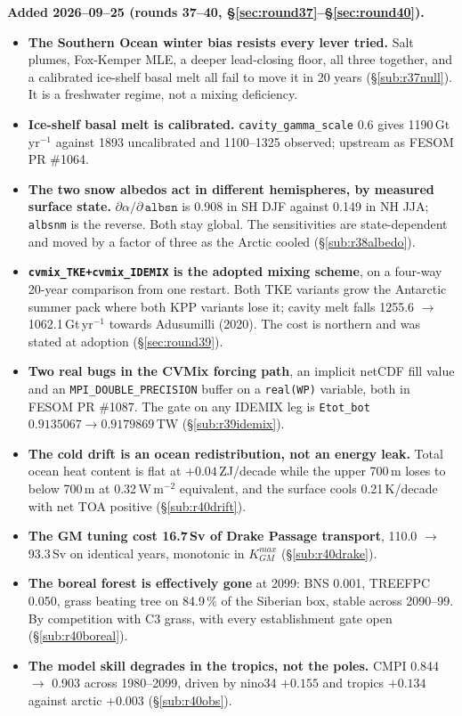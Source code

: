 \documentclass[10pt]{article}
\begin{document}
\textbf{Added 2026--09--25 (rounds 37--40, \S\ref{sec:round37}--\S\ref{sec:round40}).}
\begin{itemize}\itemsep2pt
\item \textbf{The Southern Ocean winter bias resists every lever tried.} Salt plumes, Fox-Kemper
MLE, a deeper lead-closing floor, all three together, and a calibrated ice-shelf basal melt all
fail to move it in 20 years (\S\ref{sub:r37null}). It is a freshwater regime, not a mixing
deficiency.
\item \textbf{Ice-shelf basal melt is calibrated.} \texttt{cavity\_gamma\_scale} 0.6 gives
1190\,Gt\,yr$^{-1}$ against 1893 uncalibrated and 1100--1325 observed; upstream as FESOM
PR \#1064.
\item \textbf{The two snow albedos act in different hemispheres, by measured surface state.}
$\partial\alpha/\partial\,\texttt{albsn}$ is 0.908 in SH DJF against 0.149 in NH JJA;
\texttt{albsnm} is the reverse. Both stay global. The sensitivities are state-dependent and
moved by a factor of three as the Arctic cooled (\S\ref{sub:r38albedo}).
\item \textbf{\texttt{cvmix\_TKE+cvmix\_IDEMIX} is the adopted mixing scheme}, on a four-way
20-year comparison from one restart. Both TKE variants grow the Antarctic summer pack where
both KPP variants lose it; cavity melt falls 1255.6 $\to$ 1062.1\,Gt\,yr$^{-1}$ towards
Adusumilli (2020). The cost is northern and was stated at adoption (\S\ref{sec:round39}).
\item \textbf{Two real bugs in the CVMix forcing path}, an implicit netCDF fill value and an
\texttt{MPI\_DOUBLE\_PRECISION} buffer on a \texttt{real(WP)} variable, both in FESOM PR
\#1087. The gate on any IDEMIX leg is \texttt{Etot\_bot} $0.9135067\to0.9179869$\,TW
(\S\ref{sub:r39idemix}).
\item \textbf{The cold drift is an ocean redistribution, not an energy leak.} Total ocean heat
content is flat at $+0.04$\,ZJ/decade while the upper 700\,m loses to below 700\,m at
0.32\,W\,m$^{-2}$ equivalent, and the surface cools 0.21\,K/decade with net TOA positive
(\S\ref{sub:r40drift}).
\item \textbf{The GM tuning cost 16.7\,Sv of Drake Passage transport}, 110.0 $\to$ 93.3\,Sv on
identical years, monotonic in $K_{GM}^{max}$ (\S\ref{sub:r40drake}).
\item \textbf{The boreal forest is effectively gone} at 2099: BNS 0.001, TREEFPC 0.050, grass
beating tree on 84.9\,\% of the Siberian box, stable across 2090--99. By competition with C3
grass, with every establishment gate open (\S\ref{sub:r40boreal}).
\item \textbf{The model skill degrades in the tropics, not the poles.} CMPI 0.844 $\to$ 0.903
across 1980--2099, driven by nino34 $+0.155$ and tropics $+0.134$ against arctic $+0.003$
(\S\ref{sub:r40obs}).
\end{itemize}
\end{document}
